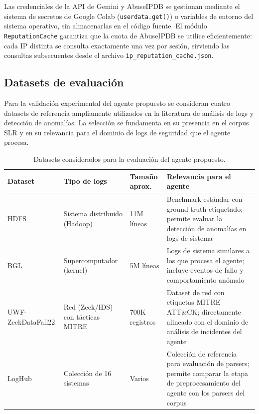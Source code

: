 Las credenciales de la API de Gemini y AbuseIPDB se
gestionan mediante el sistema de secretos de Google Colab
(\texttt{userdata.get()}) o variables de entorno del sistema
operativo, sin almacenarlas en el código fuente. El módulo
\texttt{ReputationCache} garantiza que la cuota de AbuseIPDB
se utilice eficientemente: cada IP distinta se consulta
exactamente una vez por sesión, sirviendo las consultas
subsecuentes desde el archivo \texttt{ip\_reputation\_cache.json}.

\subsection{Datasets de evaluación}

Para la validación experimental del agente propuesto se
consideran cuatro datasets de referencia ampliamente utilizados
en la literatura de análisis de logs y detección de anomalías.
La selección se fundamenta en su presencia en el corpus SLR y en su relevancia para el dominio de logs de
seguridad que el agente procesa.

\begin{table}[H]
\centering
\caption{Datasets considerados para la evaluación del
         agente propuesto.}
\label{tab:datasets}
\renewcommand{\arraystretch}{1.3}
\begin{tabularx}{\textwidth}{p{3.2 cm} p{2.8cm} p{1.8cm} X}
\toprule
\textbf{Dataset} & \textbf{Tipo de logs} &
\textbf{Tamaño aprox.} & \textbf{Relevancia para el agente} \\
\midrule
HDFS%
&
    Sistema distribuido (Hadoop) &
    11M líneas &
    Benchmark estándar con ground truth etiquetado; permite
    evaluar la detección de anomalías en logs de sistema \\
BGL%
&
    Supercomputador (kernel) &
    5M líneas &
    Logs de sistema similares a los que procesa el agente;
    incluye eventos de fallo y comportamiento anómalo \\
UWF-ZeekDataFall22%
&
    Red (Zeek/IDS) con tácticas MITRE &
    700K registros &
    Dataset de red con etiquetas MITRE ATT\&CK; directamente
    alineado con el dominio de análisis de incidentes del
    agente \\
LogHub%
&
    Colección de 16 sistemas &
    Varios &
    Colección de referencia para evaluación de parsers;
    permite comparar la etapa de preprocesamiento del agente
    con los parsers del corpus \\
\bottomrule
\end{tabularx}
\end{table}

